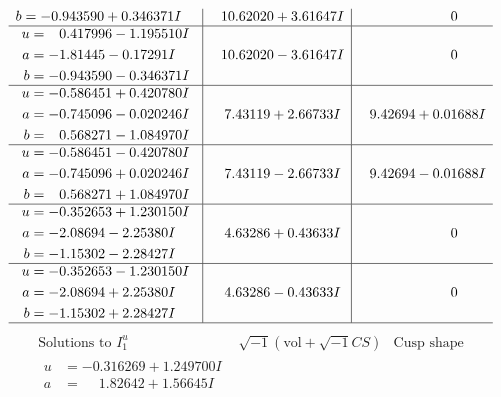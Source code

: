 \documentclass[1p]{elsarticle_modified}
\theoremstyle{definition}
\newcommand{\I}{\sqrt{-1}}
\begin{document}
$$\begin{array}{c|c|c}
\begin{aligned}
b &= -0.943590 + 0.346371 I\end{aligned}
 & \phantom{-}10.62020 + 3.61647 I & \phantom{-0.000000 } 0 \\ \hline\begin{aligned}
u &= \phantom{-}0.417996 - 1.195510 I \\
a &= -1.81445 - 0.17291 I \\
b &= -0.943590 - 0.346371 I\end{aligned}
 & \phantom{-}10.62020 - 3.61647 I & \phantom{-0.000000 } 0 \\ \hline\begin{aligned}
u &= -0.586451 + 0.420780 I \\
a &= -0.745096 - 0.020246 I \\
b &= \phantom{-}0.568271 - 1.084970 I\end{aligned}
 & \phantom{-}7.43119 + 2.66733 I & \phantom{-}9.42694 + 0.01688 I \\ \hline\begin{aligned}
u &= -0.586451 - 0.420780 I \\
a &= -0.745096 + 0.020246 I \\
b &= \phantom{-}0.568271 + 1.084970 I\end{aligned}
 & \phantom{-}7.43119 - 2.66733 I & \phantom{-}9.42694 - 0.01688 I \\ \hline\begin{aligned}
u &= -0.352653 + 1.230150 I \\
a &= -2.08694 - 2.25380 I \\
b &= -1.15302 - 2.28427 I\end{aligned}
 & \phantom{-}4.63286 + 0.43633 I & \phantom{-0.000000 } 0 \\ \hline\begin{aligned}
u &= -0.352653 - 1.230150 I \\
a &= -2.08694 + 2.25380 I \\
b &= -1.15302 + 2.28427 I\end{aligned}
 & \phantom{-}4.63286 - 0.43633 I & \phantom{-0.000000 } 0\\
 \hline 
 \end{array}$$\newpage$$\begin{array}{c|c|c}  
\text{Solutions to }I^u_{1}& \I (\text{vol} + \sqrt{-1}CS) & \text{Cusp shape}\\
 \hline 
\begin{aligned}
u &= -0.316269 + 1.249700 I \\
a &= \phantom{-}1.82642 + 1.56645 I \\

\end{aligned}
\end{array}$$
\end{document}
